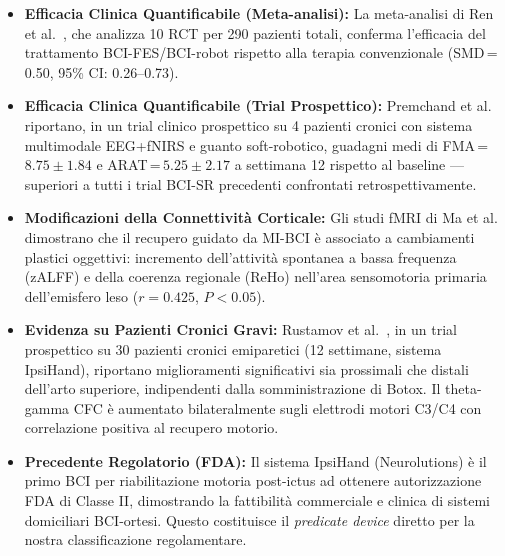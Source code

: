 \documentclass[a4paper,11pt]{article}
\begin{document}
\begin{itemize}
    \item \textbf{Efficacia Clinica Quantificabile (Meta-analisi):}
    La meta-analisi di Ren et al.\ \cite{ren2024effect}, che analizza 10 RCT
    per 290 pazienti totali, conferma l'efficacia del trattamento BCI-FES/BCI-robot
    rispetto alla terapia convenzionale (SMD\,=\,0.50, 95\% CI: 0.26--0.73).

    \item \textbf{Efficacia Clinica Quantificabile (Trial Prospettico):}
    Premchand et al.\ \cite{premchand2025personalized} riportano, in un trial
    clinico prospettico su 4 pazienti cronici con sistema multimodale EEG+fNIRS
    e guanto soft-robotico, guadagni medi di FMA\,=\,$8.75 \pm 1.84$ e
    ARAT\,=\,$5.25 \pm 2.17$ a settimana 12 rispetto al baseline — superiori
    a tutti i trial BCI-SR precedenti confrontati retrospettivamente.

    \item \textbf{Modificazioni della Connettività Corticale:}
    Gli studi fMRI di Ma et al.\ \cite{ma2024motor} dimostrano che il recupero
    guidato da MI-BCI è associato a cambiamenti plastici oggettivi: incremento
    dell'attività spontanea a bassa frequenza (zALFF) e della coerenza regionale
    (ReHo) nell'area sensomotoria primaria dell'emisfero leso
    ($r = 0.425$, $P < 0.05$).

    \item \textbf{Evidenza su Pazienti Cronici Gravi:}
    Rustamov et al.\ \cite{rustamov2025ipsihand}, in un trial prospettico su
    30 pazienti cronici emiparetici (12 settimane, sistema IpsiHand), riportano
    miglioramenti significativi sia prossimali che distali dell'arto superiore,
    indipendenti dalla somministrazione di Botox. Il theta-gamma CFC è aumentato
    bilateralmente sugli elettrodi motori C3/C4 con correlazione positiva al
    recupero motorio.

    \item \textbf{Precedente Regolatorio (FDA):}
    Il sistema IpsiHand (Neurolutions) \cite{rustamov2025ipsihand} è il primo
    BCI per riabilitazione motoria post-ictus ad ottenere autorizzazione FDA di
    Classe II, dimostrando la fattibilità commerciale e clinica di sistemi
    domiciliari BCI-ortesi. Questo costituisce il \textit{predicate device}
    diretto per la nostra classificazione regolamentare.
\end{itemize}

\end{document}
